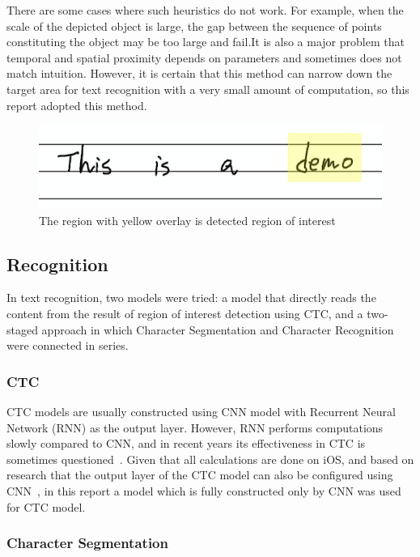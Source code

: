 There are some cases where such heuristics do not work. For example, when the scale of
the depicted object is large, the gap between the sequence of points
constituting the object may be too large and fail.It is also a major problem that
temporal and spatial proximity depends on parameters and sometimes does not match intuition.
However, it is certain that this method can narrow down the target area for text recognition
with a very small amount of computation, so this report adopted this method.

\begin{figure}
    \centering
    \includegraphics[width=\linewidth]{images/region_of_interest.png}
    \caption{The region with yellow overlay is detected region of interest}
    \label{fig:region_of_interest}
\end{figure}

\subsection{Recognition}

In text recognition, two models were tried: a model that directly reads the content from the
result of region of interest detection using CTC, and a two-staged approach in which
Character Segmentation and Character Recognition were connected in series.

\subsubsection{CTC}

CTC models are usually constructed using CNN model with Recurrent Neural Network (RNN)
as the output layer.
However, RNN performs computations slowly compared to CNN,
and in recent years its effectiveness in CTC is sometimes questioned~\cite{puigcerver2017multidimensional}.
Given that all calculations are done on iOS, and based on research that the
output layer of the CTC model can also be configured using CNN~\cite{gao2017reading}, in this report
a model which is fully constructed only by CNN was used for CTC model.

\subsubsection{Character Segmentation}


